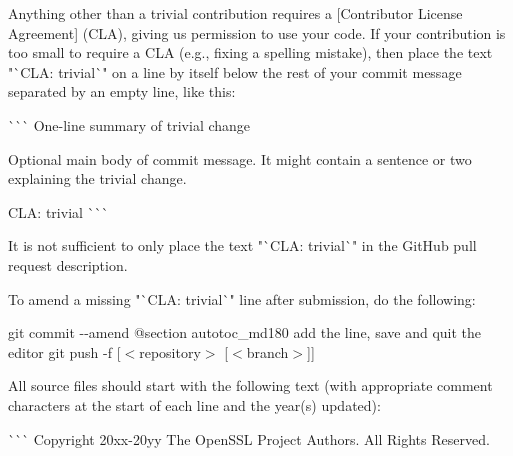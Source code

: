 \begin{DoxyEnumerate}
\item Anything other than a trivial contribution requires a \mbox{[}Contributor License Agreement\mbox{]} (CLA), giving us permission to use your code. If your contribution is too small to require a CLA (e.\+g., fixing a spelling mistake), then place the text "{}\`{}\+CLA\+: trivial\`{}"{} on a line by itself below the rest of your commit message separated by an empty line, like this\+:

\`{}\`{}\`{} One-\/line summary of trivial change

Optional main body of commit message. It might contain a sentence or two explaining the trivial change.

CLA\+: trivial \`{}\`{}\`{}

It is not sufficient to only place the text "{}\`{}\+CLA\+: trivial\`{}"{} in the Git\+Hub pull request description.

To amend a missing "{}\`{}\+CLA\+: trivial\`{}"{} line after submission, do the following\+:

{\ttfamily  git commit -\/-\/amend @section autotoc\+\_\+md180 add the line, save and quit the editor git push -\/f \mbox{[}\texorpdfstring{$<$}{<}repository\texorpdfstring{$>$}{>} \mbox{[}\texorpdfstring{$<$}{<}branch\texorpdfstring{$>$}{>}\mbox{]}\mbox{]} }
\item All source files should start with the following text (with appropriate comment characters at the start of each line and the year(s) updated)\+:

\`{}\`{}\`{} Copyright 20xx-\/20yy The Open\+SSL Project Authors. All Rights Reserved.


\end{DoxyEnumerate}
